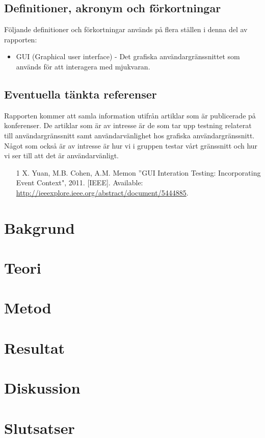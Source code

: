 \subsection{Definitioner, akronym och förkortningar}
Följande definitioner och förkortningar används på flera ställen i denna del av rapporten:
\begin{itemize}
	\item GUI (Graphical user interface) - Det grafiska användargränssnittet som används för att interagera med mjukvaran.
\end{itemize}

\subsection{Eventuella tänkta referenser}

Rapporten kommer att samla information utifrån artiklar som är publicerade på konferenser. De artiklar som är av intresse är de som tar upp testning relaterat till användargränssnitt samt användarvänlighet hos grafiska användargränssnitt. Något som också är av intresse är hur vi i gruppen testar vårt gränssnitt och hur vi ser till att det är användarvänligt.

\begin{itemize}
	\item [1] X. Yuan, M.B. Cohen, A.M. Memon \textquotedblright GUI Interation Testing: Incorporating Event Context", 2011. [IEEE]. Available: \url{http://ieeexplore.ieee.org/abstract/document/5444885}.	
\end{itemize}


\section{Bakgrund}
\label{sec:background-holmberg}


\section{Teori}
\label{sec:theory-holmberg}


\section{Metod}
\label{sec:method-holmberg}


\section{Resultat}
\label{sec:results-holmberg}


\section{Diskussion}
\label{sec:discussion-holmberg}


\section{Slutsatser}
\label{sec:conclusions-holmberg}


